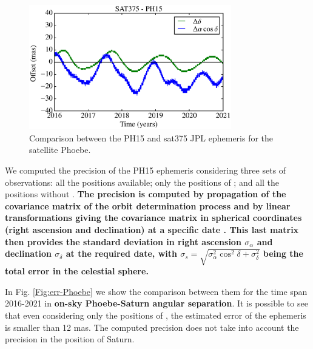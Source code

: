 \documentclass[useAMS,usenatbib]{mn2e}
\begin{document}
\begin{figure}
\begin{centering}
\includegraphics[width=8.8cm]{figures/Phoebe.eps} 
\caption{Comparison between the PH15 and sat375 JPL ephemeris for the satellite Phoebe.}
\label{Fig:eph-Phoebe}
\end{centering}
\end{figure}

We computed the precision of the PH15 ephemeris considering three sets of observations: all the positions available; only the positions of ; and all the positions without .
\textbf{The precision is computed by propagation of the covariance matrix of the orbit determination process and by linear transformations giving the covariance matrix in spherical coordinates (right ascension and declination) at a specific date \citep[for more details, see][]{Desmars2013a}. This last matrix then provides the standard deviation in right ascension $\sigma_\alpha$ and declination  $\sigma_\delta$ at the required date, with $\sigma_s=\sqrt{\sigma^2_\alpha\cos^2\delta+\sigma^2_\delta}$ being the total error in the celestial sphere.}


In Fig. \ref{Fig:err-Phoebe} we show the comparison between them for the time span 2016-2021 in \textbf{on-sky Phoebe-Saturn angular separation}. It is possible to see that even considering only the positions of , the estimated error of the ephemeris is smaller than 12 mas. The computed precision does not take into account the precision in the position of Saturn.
\end{document}
